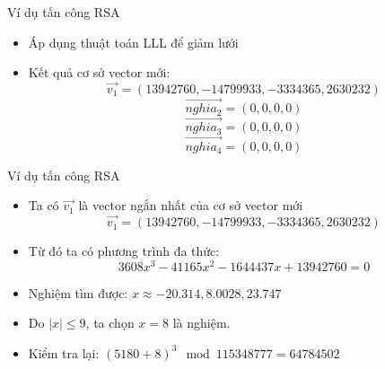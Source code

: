 \begin{frame}{Ví dụ tấn công RSA}

\begin{itemize}
\item Áp dụng thuật toán LLL để giảm lưới
\item Kết quả cơ sở vector mới:
\[
\vec{v_1} = (13942760, -14799933, -3334365, 2630232)
\]
\[
\vec{nghia_2} = (0, 0, 0, 0)
\]
\[
\vec{nghia_3} = (0, 0, 0, 0)
\]
\[
\vec{nghia_4} = (0, 0, 0, 0)
\]

\end{itemize}

\end{frame}
\begin{frame}{Ví dụ tấn công RSA}

\begin{itemize}
\item Ta có $\vec{v_1}$ là vector ngắn nhất của cơ sở vector mới
\[
\vec{v_1} = (13942760, -14799933, -3334365, 2630232)
\]
\item Từ đó ta có phương trình đa thức:
\[
3608x^3 - 41165x^2 - 1644437x + 13942760 = 0
\]
\item Nghiệm tìm được: $x \approx -20.314, 8.0028, 23.747$
\item Do $|x| \leq 9$, ta chọn $x = 8$ là nghiệm.
\item Kiểm tra lại: $(5180+8)^3 \mod 115348777 = 64784502$
\end{itemize}

\end{frame}
